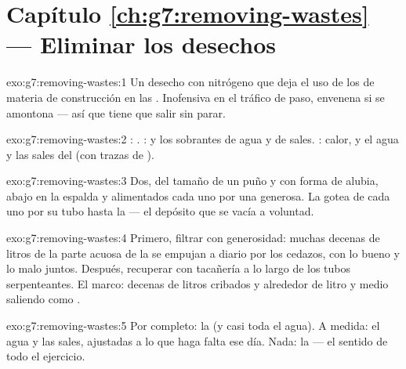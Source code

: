 \section*{Capítulo \ref{ch:g7:removing-wastes} --- Eliminar los desechos}

\begin{solution}{exo:g7:removing-wastes:1}
Un desecho con nitrógeno que deja el uso de los  de materia
de construcción en las . Inofensiva en el tráfico de paso,
envenena si se amontona --- así que tiene que salir sin parar.
\end{solution}

\begin{solution}{exo:g7:removing-wastes:2}
: . :  y los sobrantes de agua y
de sales. : calor, y el agua y las sales del  (con trazas de
).
\end{solution}

\begin{solution}{exo:g7:removing-wastes:3}
Dos, del tamaño de un puño y con forma de alubia, abajo en la espalda y
alimentados cada uno por una  generosa. La  gotea de cada
uno por su tubo hasta la  --- el depósito que se vacía a voluntad.
\end{solution}

\begin{solution}{exo:g7:removing-wastes:4}
Primero, filtrar con generosidad: muchas decenas de litros de la parte
acuosa de la  se empujan a diario por los cedazos, con lo bueno y
lo malo juntos. Después, recuperar con tacañería a lo largo de los
tubos serpenteantes. El marco: decenas de litros cribados y alrededor
de litro y medio saliendo como .
\end{solution}

\begin{solution}{exo:g7:removing-wastes:5}
Por completo: la  (y casi toda el agua). A medida: el agua y las
sales, ajustadas a lo que haga falta ese día. Nada: la  --- el
sentido de todo el ejercicio.
\end{solution}

